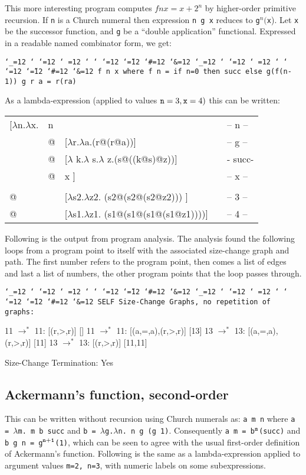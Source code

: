 \documentclass{LMCS}
\makeatletter
\newcommand{\fl}{\noindent}
\newcommand{\bt}{\begin{tabular}}
\newcommand{\et}{\end{tabular}}
\newcommand{\bp}{\begin{program}\small}
\newcommand{\ep}{\end{program}}
\newcommand{\programenvironment}{\programmode \def\par{\leavevmode\endgraf}\obeylines\nobreak \programmode}
\newcommand{\programmode}{\tt \catcode`\_=12 \catcode`\?=12 \catcode`\.=12 \catcode`\,=12
	\catcode`\;=12 \catcode`\:=12 \catcode`\@=12 \catcode`\~=12
        \catcode`\#=12 \catcode`\&=12      \obeyspaces\frenchspacing}
\newenvironment{programintext}{\programenvironment}{}
\newenvironment{program}{\setlength{\partopsep}{0mm}\setlength{\topsep}{0mm}
	\begin{trivlist}\item[]
\hspace*{5mm}\begin{minipage}{1.0\textwidth}
\vspace{1mm}
	\begin{programintext}
	}{\end{programintext}
	\vspace{1mm}
	\end{minipage}
	\end{trivlist}
	\noindent}
\theoremstyle{definition}\newtheorem{env}[thm]{Environment}
\makeatother
\begin{document}
This more interesting program computes $f n x = x + 2^n$ by 
higher-order primitive 
recursion. If {\tt n} is a Church numeral then expression {\tt n g x} reduces to
{\tt g$^n($x}). Let {\tt x} be the successor function, and {\tt g} be 
a ``double application'' functional. Expressed in a readable named 
combinator form, we get: 
\bp
   f n x    where
   f n   =  if n=0 then succ else g(f(n-1)) 
   g r a =  r(ra)
\ep\smallskip

\fl As a lambda-expression (applied to values ${\tt n}=3,{\tt x} = 4)$
this can be written:\medskip

{\tt\bt{lllll}
[$\lambda$n.$\lambda$x. & n    &&& -- n --\\
   & @ & [$\lambda$r.$\lambda$a.\fbox{11:}(r@\fbox{13:}(r@a))] && -- 
   g --\\
  & @ & [$\lambda$ k.$\lambda$ s.$\lambda$ z.(s@((k@s)@z))] && - succ-\\
  & @ & x ]   && -- x --\\\\
   @ & & [$\lambda$s2.$\lambda$z2. (s2@(s2@(s2@z2))) ]     && -- 3 --\\
   @ & & [$\lambda$s1.$\lambda$z1. (s1@(s1@(s1@(s1@z1))))] && -- 4 --
   \et}
\smallskip

\fl Following is the output from program analysis. The analysis found
the following loops from a program point to itself with the associated
size-change graph and path. The first number refers to the program point,
then comes a list of edges and last a list of numbers, the other program
points that the loop passes through. 

\bp
SELF Size-Change Graphs, no repetition of graphs: 

11 $\to^*$ 11: [(r,>,r)]           []
11 $\to^*$ 11: [(a,=,a),(r,>,r)]   [13]
13 $\to^*$ 13: [(a,=,a),(r,>,r)]   [11]
13 $\to^*$ 13: [(r,>,r)]           [11,11]

Size-Change Termination: Yes
\ep

\subsection{Ackermann's function, second-order}

This can be written without recursion  using Church numerals as:
{\tt a m n} where {\tt a = $\lambda$m. m b succ} and
{\tt b =  $\lambda$g.$\lambda$n. n g (g 1)}.  
Consequently {\tt a m = b$^{\tt m}$(succ)} and
{\tt b g n = g$^{\tt n+1}$(1)}, which can be seen to agree with the 
usual first-order definition of Ackermann's function.
Following is the same as a lambda-expression applied 
to argument values {\tt m=2, n=3}, with numeric labels on some subexpressions.
\end{document}
